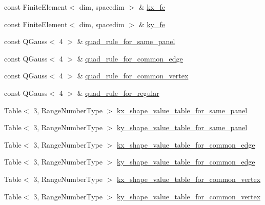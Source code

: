 \begin{DoxyCompactItemize}
\item 
const Finite\+Element$<$ dim, spacedim $>$ \& \hyperlink{classLaplaceBEM_1_1BEMValues_a9107fb87f456e86caa04ba3348982189}{kx\+\_\+fe}
\item 
const Finite\+Element$<$ dim, spacedim $>$ \& \hyperlink{classLaplaceBEM_1_1BEMValues_a30eaa0b6f1e587c5b8d95a04d80fa9a8}{ky\+\_\+fe}
\item 
const Q\+Gauss$<$ 4 $>$ \& \hyperlink{classLaplaceBEM_1_1BEMValues_aabf571f3c530ff65274122e468c3c987}{quad\+\_\+rule\+\_\+for\+\_\+same\+\_\+panel}
\item 
const Q\+Gauss$<$ 4 $>$ \& \hyperlink{classLaplaceBEM_1_1BEMValues_ac1cdb156deba4802692ca916d40bacda}{quad\+\_\+rule\+\_\+for\+\_\+common\+\_\+edge}
\item 
const Q\+Gauss$<$ 4 $>$ \& \hyperlink{classLaplaceBEM_1_1BEMValues_a2b964d73a6d9bd80fe1ef419e1cebd4f}{quad\+\_\+rule\+\_\+for\+\_\+common\+\_\+vertex}
\item 
const Q\+Gauss$<$ 4 $>$ \& \hyperlink{classLaplaceBEM_1_1BEMValues_a65083f9822aa923512c775d0d9986939}{quad\+\_\+rule\+\_\+for\+\_\+regular}
\item 
Table$<$ 3, Range\+Number\+Type $>$ \hyperlink{classLaplaceBEM_1_1BEMValues_af837344cd836aa6ed93fcf6307157174}{kx\+\_\+shape\+\_\+value\+\_\+table\+\_\+for\+\_\+same\+\_\+panel}
\item 
Table$<$ 3, Range\+Number\+Type $>$ \hyperlink{classLaplaceBEM_1_1BEMValues_a10f53c8eacb5d445c5289ca6b7ca3bfe}{ky\+\_\+shape\+\_\+value\+\_\+table\+\_\+for\+\_\+same\+\_\+panel}
\item 
Table$<$ 3, Range\+Number\+Type $>$ \hyperlink{classLaplaceBEM_1_1BEMValues_a45a3db6a8850b758849542c0c2f9d48e}{kx\+\_\+shape\+\_\+value\+\_\+table\+\_\+for\+\_\+common\+\_\+edge}
\item 
Table$<$ 3, Range\+Number\+Type $>$ \hyperlink{classLaplaceBEM_1_1BEMValues_ab4fdc0a5ff8c0aa63e4901436e29598b}{ky\+\_\+shape\+\_\+value\+\_\+table\+\_\+for\+\_\+common\+\_\+edge}
\item 
Table$<$ 3, Range\+Number\+Type $>$ \hyperlink{classLaplaceBEM_1_1BEMValues_a84bdf210acf62ae9ba68326a98e3d306}{kx\+\_\+shape\+\_\+value\+\_\+table\+\_\+for\+\_\+common\+\_\+vertex}
\item 
Table$<$ 3, Range\+Number\+Type $>$ \hyperlink{classLaplaceBEM_1_1BEMValues_a83243ee09e5105eaa81b5d622e3be3ce}{ky\+\_\+shape\+\_\+value\+\_\+table\+\_\+for\+\_\+common\+\_\+vertex}
\item 

\end{DoxyCompactItemize}
